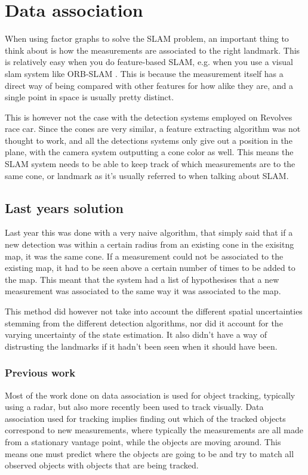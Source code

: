 \section{Data association}

When using factor graphs to solve the SLAM problem, an important thing to think about is how the measurements are associated to the right landmark. This is relatively easy when you do feature-based SLAM, e.g. when you use a visual slam system like ORB-SLAM \cite{ORBSLAM}. This is because the measurement itself has a direct way of being compared with other features for how alike they are, and a single point in space is usually pretty distinct. 

This is however not the case with the detection systems employed on Revolves race car. Since the cones are very similar, a feature extracting algorithm was not thought to work, and all the detections systems only give out a position in the plane, with the camera system outputting a cone color as well. This means the SLAM system needs to be able to keep track of which measurements are to the same cone, or landmark as it's usually referred to when talking about SLAM. 

\subsection{Last years solution}

Last year this was done with a very naive algorithm, that simply said that if a new detection was within a certain radius from an existing cone in the exisitng map, it was the same cone. If a measurement could not be associated to the existing map, it had to be seen above a certain number of times to be added to the map. This meant that the system had a list of hypothesises that a new measurement was associated to the same way it was associated to the map. 

This method did however not take into account the different spatial uncertainties stemming from the different detection algorithms, nor did it account for the varying uncertainty of the state estimation. It also didn't have a way of distrusting the landmarks if it hadn't been seen when it should have been. 

\subsubsection{Previous work} 

Most of the work done on data association is used for object tracking, typically using a radar\cite{RadarTracking}, but also more recently been used to track visually\cite{VisualTracking}. Data association used for tracking implies finding out which of the tracked objects correspond to new measurements, where typically the measurements are all made from a stationary vantage point, while the objects are moving around. This means one must predict where the objects are going to be and try to match all observed objects with objects that are being tracked. 

